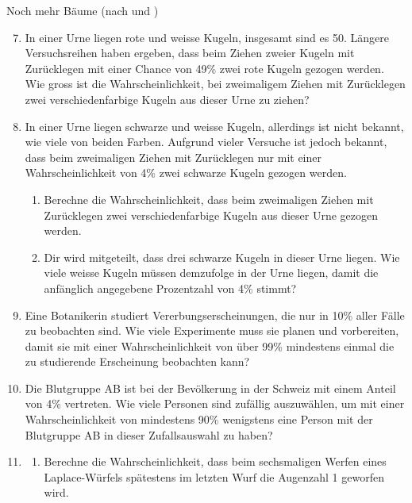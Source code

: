 \begin{ueb}
  {Noch mehr Bäume (nach  und )}{}
  \begin{enumerate}
    \setcounter{enumi}{6}

    \item In einer Urne liegen rote und weisse Kugeln, insgesamt sind es 50. Längere Versuchsreihen haben ergeben, dass beim Ziehen zweier Kugeln mit Zurücklegen mit einer Chance von 49\% zwei rote Kugeln gezogen werden. Wie gross ist die Wahrscheinlichkeit, bei zweimaligem Ziehen mit Zurücklegen zwei verschiedenfarbige Kugeln aus dieser Urne zu ziehen?

    \item In einer Urne liegen schwarze und weisse Kugeln, allerdings ist nicht bekannt, wie viele von beiden Farben. Aufgrund vieler Versuche ist jedoch bekannt, dass beim zweimaligen Ziehen mit Zurücklegen nur mit einer Wahrscheinlichkeit von 4\% zwei schwarze Kugeln gezogen werden.

          \begin{enumerate}
            \item Berechne die Wahrscheinlichkeit, dass beim zweimaligen Ziehen mit Zurücklegen zwei verschiedenfarbige Kugeln aus dieser Urne gezogen werden.

            \item Dir wird mitgeteilt, dass drei schwarze Kugeln in dieser Urne liegen. Wie viele weisse Kugeln müssen demzufolge in der Urne liegen, damit die anfänglich angegebene Prozentzahl von 4\% stimmt?
          \end{enumerate}

    \item Eine Botanikerin studiert Vererbungserscheinungen, die nur in 10\% aller Fälle zu beobachten sind. Wie viele Experimente muss sie planen und vorbereiten, damit sie mit einer Wahrscheinlichkeit von über 99\% mindestens einmal die zu studierende Erscheinung beobachten kann?

    \item Die Blutgruppe AB ist bei der Bevölkerung in der Schweiz mit einem Anteil von 4\% vertreten. Wie viele Personen sind zufällig auszuwählen, um mit einer Wahrscheinlichkeit von mindestens 90\% wenigstens eine Person mit der Blutgruppe AB in dieser Zufallsauswahl zu haben?

    \item
          \begin{enumerate}
            \item Berechne die Wahrscheinlichkeit, dass beim sechsmaligen Werfen eines Laplace-Würfels spätestens im letzten Wurf die Augenzahl 1 geworfen wird.


\end{enumerate}
\end{enumerate}
\end{ueb}

